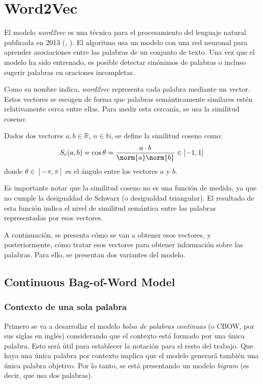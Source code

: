 \chapter{Word2Vec}

El modelo \textit{word2vec} es una técnica para el procesamiento del lenguaje natural publicada en 2013 (\cite{word2vec:1}, \cite{word2vec:2}).
El algoritmo usa un modelo con una red neuronal para aprender asociaciones entre las palabras de un conjunto de texto. Una vez que el modelo ha
sido entrenado, es posible detectar sinónimos de palabras o incluso sugerir palabras en oraciones incompletas.

Como su nombre indica, \textit{word2vec} representa cada palabra mediante un vector. Estos vectores se escogen de forma que palabras semánticamente similares
estén relativamente cerca entre ellas. Para medir esta cercanía, se usa la similitud coseno:

\begin{definition}
  Dados dos vectores $a,b\in\mathbb{R}$, $n\in\mathbb{N}$, se define la similitud coseno como:
  \[
    S_c(a,b)=\cos\theta = \frac{a\cdot b}{\norm{a}\norm{b}} \in [-1, 1]
  \]
donde $\theta\in[-\pi,\pi]$ es el ángulo entre los vectores $a$ y $b$.
\end{definition}

Es importante notar que la similitud coseno no es una función de medida, ya que no cumple la desigualdad de Schwarz (o desigualdad triangular). El resultado
de esta función indica el nivel de similitud semántica entre las palabras representadas por esos vectores.

A continuación, se presenta cómo se van a obtener esos vectores, y posteriormente, cómo tratar esos vectores para obtener información sobre las palabras. Para
ello, se presentan dos variantes del modelo.

\section{Continuous Bag-of-Word Model}

\subsection{Contexto de una sola palabra}

Primero se va a desarrollar el modelo \textit{bolsa de palabras continuas} (o CBOW, por sus siglas en inglés) considerando que el contexto está formado por una única palabra.
Esto será útil para establecer la notación para el resto del trabajo. Que haya una única palabra por contexto implica que el modelo generará también una única palabra objetivo.
Por lo tanto, se está presentando un modelo \textit{bigram} (es decir, que usa dos palabras).

